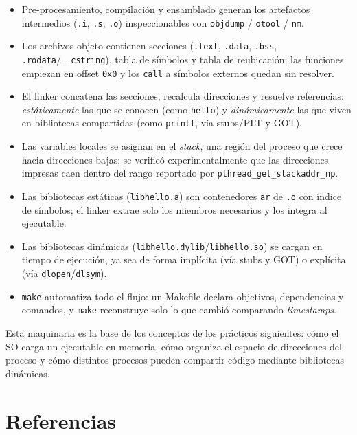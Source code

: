 \documentclass[11pt,a4paper]{article}
\begin{document}
\begin{itemize}[leftmargin=*]
    \item Pre-procesamiento, compilación y ensamblado generan los
        artefactos intermedios (\texttt{.i}, \texttt{.s}, \texttt{.o})
        inspeccionables con \texttt{objdump} / \texttt{otool} /
        \texttt{nm}.
    \item Los archivos objeto contienen secciones (\texttt{.text},
        \texttt{.data}, \texttt{.bss}, \texttt{.rodata}/\texttt{\_\_cstring}),
        tabla de símbolos y tabla de reubicación; las funciones
        empiezan en offset \texttt{0x0} y los \texttt{call} a símbolos
        externos quedan sin resolver.
    \item El linker concatena las secciones, recalcula direcciones y
        resuelve referencias: \emph{estáticamente} las que se conocen
        (como \texttt{hello}) y \emph{dinámicamente} las que viven en
        bibliotecas compartidas (como \texttt{printf}, vía
        stubs/PLT y GOT).
    \item Las variables locales se asignan en el \emph{stack}, una
        región del proceso que crece hacia direcciones bajas; se
        verificó experimentalmente que las direcciones impresas caen
        dentro del rango reportado por
        \texttt{pthread\_get\_stackaddr\_np}.
    \item Las bibliotecas estáticas (\texttt{libhello.a}) son
        contenedores \texttt{ar} de \texttt{.o} con índice de
        símbolos; el linker extrae solo los miembros necesarios y los
        integra al ejecutable.
    \item Las bibliotecas dinámicas
        (\texttt{libhello.dylib}/\texttt{libhello.so}) se cargan en
        tiempo de ejecución, ya sea de forma implícita (vía stubs y
        GOT) o explícita (vía \texttt{dlopen}/\texttt{dlsym}).
    \item \texttt{make} automatiza todo el flujo: un Makefile declara
        objetivos, dependencias y comandos, y \texttt{make}
        reconstruye solo lo que cambió comparando \emph{timestamps}.
\end{itemize}

Esta maquinaria es la base de los conceptos de los prácticos
siguientes: cómo el SO carga un ejecutable en memoria, cómo organiza
el espacio de direcciones del proceso y cómo distintos procesos
pueden compartir código mediante bibliotecas dinámicas.

\section*{Referencias}
\end{document}
